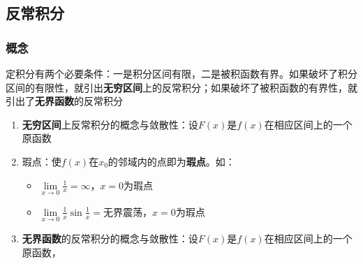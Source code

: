 \documentclass[../book.tex]{subfiles}
\begin{document}
    \subsection{反常积分}

    \subsubsection{概念}

    定积分有两个必要条件：一是积分区间有限，二是被积函数有界。如果破坏了积分区间的有限性，就引出\textbf{无穷区间}上的反常积分；如果破坏了被积函数的有界性，就引出了\textbf{无界函数}的反常积分

    \begin{enumerate}
        \item \textbf{无穷区间}上反常积分的概念与敛散性：设$F(x)$是$f(x)$在相应区间上的一个原函数
        \item 瑕点：使$f(x)$在$x_0$的邻域内\textbf{\color{red}{无界}}的点即为\textbf{瑕点}。如：
        \begin{itemize}
            \item $\lim\limits_{x\to 0} \displaystyle\frac{1}{x} = \infty$，$x = 0$为瑕点
            \item $\lim\limits_{x\to 0} \displaystyle\frac{1}{x} \sin \displaystyle\frac{1}{x} = \text{无界震荡}$，$x = 0$为瑕点
        \end{itemize}
        \item \textbf{无界函数}的反常积分的概念与敛散性：设$F(x)$是$f(x)$在相应区间上的一个原函数，{\color{red}{$x_0$为$f(x)$的瑕点}}
\end{enumerate}
\end{document}
